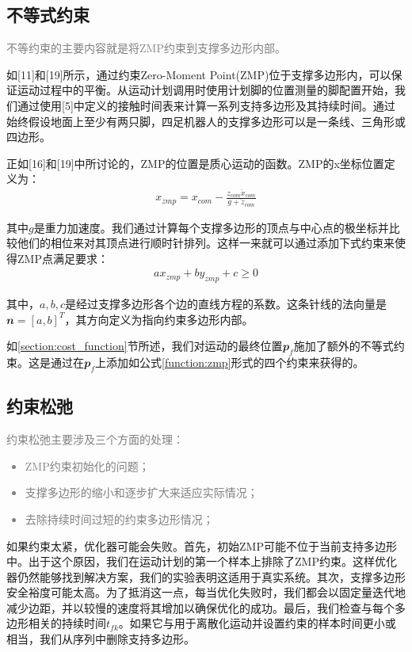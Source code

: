 \subsection[不等式约束]{不等式约束}

\textcolor{gray}{\small
    不等约束的主要内容就是将ZMP约束到支撑多边形内部。}

如[11]和[19]所示，通过约束Zero-Moment Point(ZMP)位于支撑多边形内，可以保证运动过程中的平衡。从运动计划调用时使用计划脚的位置测量的脚配置开始，我们通过使用[5]中定义的接触时间表来计算一系列支持多边形及其持续时间。通过始终假设地面上至少有两只脚，四足机器人的支撑多边形可以是一条线、三角形或四边形。

正如[16]和[19]中所讨论的，ZMP的位置是质心运动的函数。ZMP的x坐标位置定义为：
\begin{align}
    \label{function:zmp}
    x_{zmp}=x_{com}-\frac{z_{com}\ddot x_{com}}{g+\ddot z_{com}}
\end{align}

其中$g$是重力加速度。我们通过计算每个支撑多边形的顶点与中心点的极坐标并比较他们的相位来对其顶点进行顺时针排列。这样一来就可以通过添加下式约束来使得ZMP点满足要求：
\begin{align}
    ax_{zmp}+by_{zmp}+c\geq 0
\end{align}

其中，$a,b,c$是经过支撑多边形各个边的直线方程的系数。这条针线的法向量是$\mathbfit{n}=[a,b]^T$，其方向定义为指向约束多边形内部。

如\ref{section:cost_function}节所述，我们对运动的最终位置$\mathbfit{p}_f$施加了额外的不等式约束。这是通过在$\mathbfit{p}_f$上添加如公式\eqref{function:zmp}形式的四个约束来获得的。


\subsection[约束松弛]{约束松弛}

\textcolor{gray}{\small
约束松弛主要涉及三个方面的处理：
\begin{itemize}
    \item ZMP约束初始化的问题；
    \item 支撑多边形的缩小和逐步扩大来适应实际情况；
    \item 去除持续时间过短的约束多边形情况；
\end{itemize}
}

如果约束太紧，优化器可能会失败。首先，初始ZMP可能不位于当前支持多边形中。出于这个原因，我们在运动计划的第一个样本上排除了ZMP约束。这样优化器仍然能够找到解决方案，我们的实验表明这适用于真实系统。其次，支撑多边形安全裕度可能太高。为了抵消这一点，每当优化失败时，我们都会以固定量迭代地减少边距，并以较慢的速度将其增加以确保优化的成功。最后，我们检查与每个多边形相关的持续时间$t_{fk}$。如果它与用于离散化运动并设置约束的样本时间更小或相当，我们从序列中删除支持多边形。























